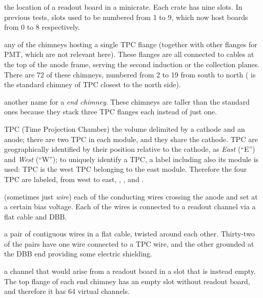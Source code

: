 \begin{description}
  \item[Slot]
    the location of a readout board in a minicrate. Each crate has nine slots.
    In previous tests, slots used to be numbered from 1 to 9, which now host
    boards from 0 to 8 respectively.

  \item[Standard chimney]
    any of the chimneys hosting a single TPC flange (together with other flanges
    for PMT, which are not relevant here). These flanges are all connected to
    cables at the top of the anode frame, serving the second induction or the
    collection planes. There are 72 of these chimneys,
    numbered from 2 to 19 from south to north (\eg {} is the
    standard chimney of TPC  closest to the north side).

  \item[Tall chimney]
    another name for a \emph{end chimney}. These chimneys are taller than the
    standard ones because they stack three TPC flanges each instead of just one.

  \item{TPC}
    (Time Projection Chamber) the volume delimited by a cathode and an
    anode; there are two TPC in each module, and they share the cathode.
    TPC are geographically identified by their position relative to the cathode,
    as \emph{East} (``E'') and \emph{West} (``W''); to uniquely identify a TPC,
    a label including also its module is used: TPC  is the west TPC
    belonging to the east module. Therefore the four TPC are labeled, from west
    to east, , ,  and .

  \item[TPC wire]
    (sometimes just \emph{wire}) each of the conducting wires
    crossing the anode and set at a certain bias voltage.
    Each of the wires is connected to a readout channel via a flat cable and DBB.

  \item[Twisted pair]
    a pair of contiguous wires in a flat cable, twisted around
    each other. Thirty-two of the pairs have one wire connected to a TPC wire,
    and the other grounded at the DBB end providing some electric shielding.

  \item[Virtual channel]
    a channel that would arise from a readout board in a slot that is instead
    empty. The top flange of each end chimney has an empty slot without readout
    board, and therefore it has 64 virtual channels.
  

\end{description}
